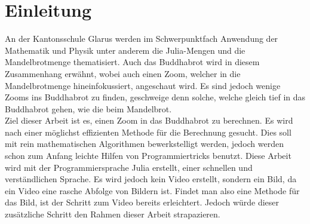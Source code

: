 \section{Einleitung}
An der Kantonsschule Glarus werden im Schwerpunktfach Anwendung der Mathematik und Physik unter anderem die Julia-Mengen und die Mandelbrotmenge thematisiert. Auch das Buddhabrot wird in diesem Zusammenhang erwähnt, wobei auch einen Zoom, welcher in die Mandelbrotmenge hineinfokussiert, angeschaut wird. Es sind jedoch wenige Zooms ins Buddhabrot zu finden, geschweige denn solche, welche gleich tief in das Buddhabrot gehen, wie die beim Mandelbrot.\\ 
Ziel dieser Arbeit ist es, einen Zoom in das Buddhabrot zu berechnen. Es wird nach einer möglichst effizienten Methode für die Berechnung gesucht. Dies soll mit rein mathematischen Algorithmen bewerkstelligt werden, jedoch werden schon zum Anfang leichte Hilfen von Programmiertricks benutzt. Diese Arbeit wird mit der Programmiersprache Julia erstellt, einer schnellen und verständlichen Sprache. Es wird jedoch kein Video erstellt, sondern ein Bild, da ein Video eine rasche Abfolge von Bildern ist. Findet man also eine Methode für das Bild, ist der Schritt zum Video bereits erleichtert. Jedoch würde dieser zusätzliche Schritt den Rahmen dieser Arbeit strapazieren.